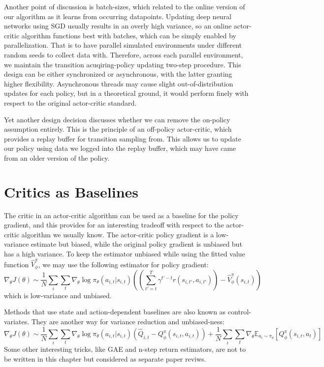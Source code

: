 Another point of discussion is batch-sizes, which related to the online version of our algorithm as it learns from occurring datapoints.
Updating deep neural networks using SGD usually results in an overly high variance, so an online actor-critic algorithm functions best with batches, which can be simply enabled by parallelization.
That is to have parallel simulated environments under different random seeds to collect data with.
Therefore, across each parallel environment, we maintain the transition acuqiring-policy updating two-step procedure.
This design can be either synchronized or asynchronous, with the latter granting higher flexibility.
Asynchronous threads may cause slight out-of-distribution updates for each policy, but in a theoretical ground, it would perform finely with respect to the original actor-critic standard.

Yet another design decision discusses whether we can remove the on-policy assumption entirely.
This is the principle of an off-policy actor-critic, which provides a replay buffer for transition sampling from.
This allows us to update our policy using data we logged into the replay buffer, which may have came from an older version of the policy.

\section{Critics as Baselines}
The critic in an actor-critic algorithm can be used as a baseline for the policy gradient, and this provides for an interesting tradeoff with respect to the actor-critic algorithm we usually know.
The actor-critic policy gradient is a low-variance estimate but biased, while the original policy gradient is unbiased but has a high variance.
To keep the estimator unbiased while using the fitted value function $\hat{V}_\phi^\pi$, we may use the following estimator for policy gradient:
\[
    \nabla_\theta J(\theta) \sim \frac{1}{N} \sum_i \sum_t \nabla_\theta \log \pi_\theta (a_{i,t} | s_{i,t}) \left( \left( \sum_{t'=t}^T \gamma^{t'-t} r(s_{i,t'}, a_{i,t'}) \right) - \hat{V}_\phi^\pi (s_{i,t}) \right)
\]
which is low-variance and unbiased.

Methods that use state and action-dependent baselines are also known as control-variates.
They are another way for variance reduction and unbiased-ness:
\[
    \nabla_\theta J(\theta) \sim \frac{1}{N} \sum_i \sum_t \nabla_\theta \log \pi_\theta (a_{i,t} | s_{i,t}) (\hat{Q}_{i,t} - Q_\phi^\pi (s_{i,t}, a_{i,t})) + \frac{1}{N} \sum_i \sum_t \nabla_\theta \mathbb{E}_{a_t \sim \pi_\theta} [Q_\phi^\pi (s_{i,t}, a_t)]
\]
Some other interesting tricks, like GAE and n-step return estimators, are not to be written in this chapter but considered as separate paper reviws.
